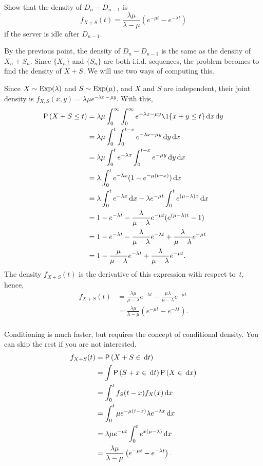 \begin{extra}
Show that the density of $D_{n} - D_{n-1}$ is
 \begin{equation*}
 f_{X+S}(t) = \frac{\lambda \mu}{\lambda - \mu} (e^{-\mu t} - e^{-\lambda t})
 \end{equation*}
if the server is idle after $D_{n-1}$.
\begin{solution}
 By the previous point, the density of $D_{n} - D_{n-1}$ is the
 same as the density of $X_n + S_n$. Since $\{X_n\}$ and $\{S_n\}$ are both i.i.d. sequences, the problem becomes to find the density of $X+S$. We will use two ways of computing this. 

Since $X\sim \operatorname{Exp}(\lambda)$ and $S\sim\operatorname{Exp}(\mu)$, and $X$ and $S$ are independent, their joint density is $f_{X,S}(x,y) = \lambda \mu e^{-\lambda x - \mu y}$. With this,
 \begin{align*}
\P{X+S\leq t } 
&= \lambda \mu \int_0^\infty \int_0^\infty e^{-\lambda x - \mu y} \1{x+y\leq t} \d x \d y \\
&= \lambda \mu \int_0^t \int_0^{t-x} e^{-\lambda x - \mu y} \d y \d x \\
&= \lambda \mu \int_0^t e^{-\lambda x} \int_0^{t-x} e^{- \mu y} \d y \d x \\
&= \lambda \int_0^t e^{-\lambda x} (1-e^{- \mu (t-x)} ) \d x \\
&= \lambda \int_0^t e^{-\lambda x} \d x - \lambda e^{-\mu t} \int_0^t e^{(\mu-\lambda) x} \d x \\
&= 1- e^{-\lambda t} - \frac{\lambda}{\mu-\lambda} e^{-\mu t} ( e^{(\mu-\lambda) t} -1) \\
&= 1- e^{-\lambda t} - \frac{\lambda}{\mu-\lambda} e^{-\lambda t} + \frac{\lambda}{\mu-\lambda} e^{-\mu t} \\ 
&= 1 - \frac{\mu}{\mu-\lambda} e^{-\lambda t} + \frac{\lambda}{\mu-\lambda} e^{-\mu t}. \\
 \end{align*}
The density $f_{X+S}(t)$ is the derivative of this expression with respect to~$t$, hence,
\begin{align*}
 f_{X+S}(t) 
&= \frac{\lambda\mu}{\mu-\lambda} e^{-\lambda t} - \frac{\mu \lambda}{\mu-\lambda} e^{-\mu t} \\
&= \frac{\lambda\mu}{\lambda -\mu}(e^{-\mu t} - e^{-\lambda t}). \\
\end{align*}

Conditioning is much faster, but requires the concept of conditional density. You can skip the rest if you are not interested. 
 \begin{align*}
 f_{X+S}(t) 
&= \P{X+S\in \d{t}} \\
&= \int \P{S+x\in \d{t}}\P{X\in \d{x}} \\
&=\int_0^t f_S(t-x) f_X(x) \d{x} \\
 &= \int_0^t \mu e^{-\mu(t-x)} \lambda e^{-\lambda x} \d{x} \\
 &= \lambda \mu e^{-\mu t} \int_0^t e^{x(\mu-\lambda)} \d{x} \\
&= \frac{\lambda \mu}{\lambda - \mu}\left(e^{-\mu t} - e^{-\lambda t}\right).
 \end{align*}
\end{solution}
\end{extra}


